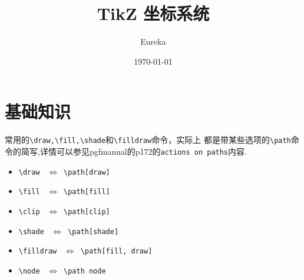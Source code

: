 \documentclass[12pt]{article}
\title{TikZ 坐标系统}
\author{Eureka}
\date{\today}
\newcommand{\lrl}{~\ensuremath{\Longleftrightarrow}~}
\begin{document}
\maketitle
\tableofcontents
\clearpage


\section{基础知识}
常用的\verb|\draw,\fill,\shade|和\verb|\filldraw|命令，实际上
都是带某些选项的\verb|\path|命令的简写,详情可以参见pgfmanual的p172的\verb|actions on paths|内容.
\begin{itemize}
    \item \verb|\draw| \lrl\verb|\path[draw]|
    \item \verb|\fill| \lrl\verb|\path[fill]|
    \item \verb|\clip| \lrl\verb|\path[clip]|
    \item \verb|\shade| \lrl\verb|\path[shade]|
    \item \verb|\filldraw| \lrl\verb|\path[fill, draw]|
    \item \verb|\node| \lrl \verb|\path node|
\end{itemize}
\end{document}
